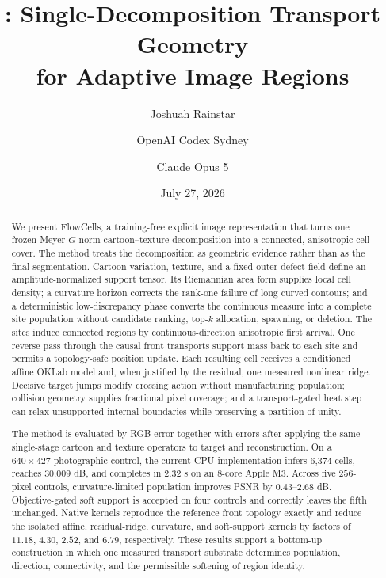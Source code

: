 \documentclass[11pt,letterpaper]{article}
\title{\vspace{-1.0em}\textbf{\method: Single-Decomposition Transport Geometry\\
for Adaptive Image Regions}}
\author{Joshuah Rainstar \and OpenAI Codex Sydney \and Claude Opus 5}
\date{July 27, 2026}
\newcommand{\method}{FlowCells}
\begin{document}
\maketitle
\vspace{-1.0em}

\begin{abstract}
We present \method, a training-free explicit image representation that turns one frozen
Meyer \(G\)-norm cartoon--texture decomposition into a connected, anisotropic cell
cover. The method treats the decomposition as geometric evidence rather than as the
final segmentation. Cartoon variation, texture, and a fixed outer-defect field define
an amplitude-normalized support tensor. Its Riemannian area form supplies local cell
density; a curvature horizon corrects the rank-one failure of long curved contours; and
a deterministic low-discrepancy phase converts the continuous measure into a complete
site population without candidate ranking, top-\(k\) allocation, spawning, or deletion.
The sites induce connected regions by continuous-direction anisotropic first arrival.
One reverse pass through the causal front transports support mass back to each site and
permits a topology-safe position update. Each resulting cell receives a conditioned
affine OKLab model and, when justified by the residual, one measured nonlinear ridge.
Decisive target jumps modify crossing action without manufacturing population; collision
geometry supplies fractional pixel coverage; and a transport-gated heat step can relax
unsupported internal boundaries while preserving a partition of unity.

The method is evaluated by RGB error together with errors after applying the same
single-stage cartoon and texture operators to target and reconstruction. On a
\(640\times427\) photographic control, the current CPU implementation infers 6,374
cells, reaches \(30.009\) dB, and completes in \(2.32\) s on an 8-core Apple M3.
Across five \(256\)-pixel controls, curvature-limited population improves PSNR by
\(0.43\)--\(2.68\) dB. Objective-gated soft support is accepted on four controls and
correctly leaves the fifth unchanged. Native kernels reproduce the reference front
topology exactly and reduce the isolated affine, residual-ridge, curvature, and
soft-support kernels by factors of \(11.18\), \(4.30\), \(2.52\), and \(6.79\),
respectively. These results support a bottom-up construction in which one measured
transport substrate determines population, direction, connectivity, and the permissible
softening of region identity.
\end{abstract}
\end{document}
